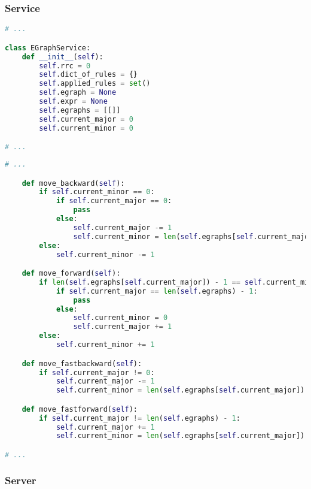 \subsubsection{Service}




\begin{lstlisting}[language=Python, caption=Auszug aus der Datei \textit{EGraphService.py}]
# ... 

class EGraphService:
    def __init__(self):
        self.rrc = 0
        self.dict_of_rules = {}
        self.applied_rules = set()
        self.egraph = None
        self.expr = None
        self.egraphs = [[]]
        self.current_major = 0
        self.current_minor = 0

# ... 
\end{lstlisting} 





\begin{lstlisting}[language=Python, caption=Methoden für das Debugging aus der Datei \textit{EGraphService.py}]
# ... 

    def move_backward(self):
        if self.current_minor == 0:
            if self.current_major == 0:
                pass
            else:
                self.current_major -= 1
                self.current_minor = len(self.egraphs[self.current_major]) - 1
        else:
            self.current_minor -= 1

    def move_forward(self):
        if len(self.egraphs[self.current_major]) - 1 == self.current_minor:
            if self.current_major == len(self.egraphs) - 1:
                pass
            else:
                self.current_minor = 0
                self.current_major += 1
        else:
            self.current_minor += 1

    def move_fastbackward(self):
        if self.current_major != 0:
            self.current_major -= 1
            self.current_minor = len(self.egraphs[self.current_major]) - 1

    def move_fastforward(self):
        if self.current_major != len(self.egraphs) - 1:
            self.current_major += 1
            self.current_minor = len(self.egraphs[self.current_major]) - 1

# ... 
\end{lstlisting} 



\subsubsection{Server}

